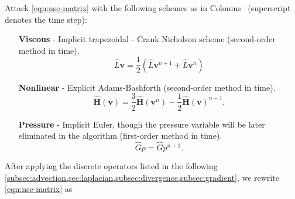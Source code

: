 \documentclass{article}
\numberwithin{equation}{section}
\begin{document}
Attack \cref{eqn:nse-matrix} with the following schemes as in Colonius~\cite{Colonius:2008} (superscript denotes the time step):
\begin{enumerate}
	\item[\textbf{Viscous}] - Implicit trapezoidal - Crank Nicholson scheme (second-order method in time).  
	\begin{equation}\label{eqn:viscous-crank-nicholson}
  		\hat{L}\boldsymbol{v}=\frac{1}{2}\left(\hat{L}\boldsymbol{v}^{n+1}+\hat{L}\boldsymbol{v}^n\right)
	\end{equation}

	\item[\textbf{Nonlinear}] - Explicit Adams-Bashforth (second-order method in time).
	\begin{equation}\label{eqn:nonlinear-adams-bashforth}
		\mathbf{\hat{H}}(\boldsymbol{v}) = \frac{3}{2}\mathbf{\hat{H}}(\boldsymbol{v}^{n}) - \frac{1}{2}\mathbf{\hat{H}}(\boldsymbol{v})^{n-1}.
	\end{equation}

	\item[\textbf{Pressure}] - Implicit Euler, though the pressure variable will be later eliminated in the algorithm (first-order method in time). 
	\begin{equation}\label{eqn:pressure-implicit-euler} 
		\hat{G}p = \hat{G}p^{n+1}.
	\end{equation}
\end{enumerate}

After applying the discrete operators listed in the following \cref{subsec:advection,sec:laplacian,subsec:divergence,subsec:gradient}, we rewrite \cref{eqn:nse-matrix}  as
\end{document}
